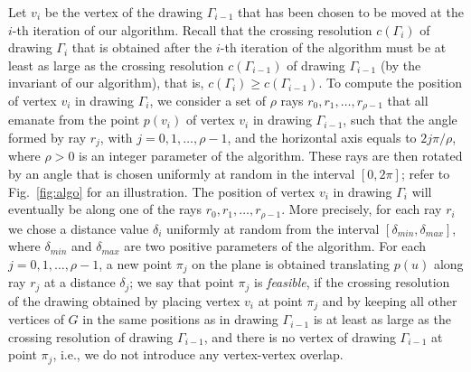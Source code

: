 \documentclass[runningheads]{llncs}
\begin{document}
Let $v_i$ be the vertex of the drawing $\Gamma_{i-1}$ that has been chosen to be moved at the $i$-th iteration of our algorithm. Recall that the crossing resolution $c(\Gamma_{i})$ of drawing $\Gamma_{i}$ that is obtained after the $i$-th iteration of the algorithm must be at least as large as the crossing resolution $c(\Gamma_{i-1})$ of drawing $\Gamma_{i-1}$ (by the invariant of our algorithm), that is, $c(\Gamma_i) \ge c(\Gamma_{i-1})$. To compute the position of vertex $v_i$ in drawing $\Gamma_i$, we consider a set of $\rho$ rays $r_0,r_1,\ldots,r_{\rho-1}$ that all emanate from the point $p(v_i)$ of vertex $v_i$ in drawing $\Gamma_{i-1}$, such that the angle formed by ray $r_j$, with $j=0,1,\ldots,\rho-1$, and the horizontal axis equals to $2j\pi/\rho$, where $\rho>0$ is an integer parameter of the algorithm. These rays are then rotated by an angle that is chosen uniformly at random in the interval $[0,2\pi]$; refer to Fig.~\ref{fig:algo} for an illustration. The position of vertex $v_i$ in drawing $\Gamma_i$ will eventually be along one of the rays $r_0,r_1,\ldots,r_{\rho-1}$. More precisely, for each ray $r_i$ we chose a distance value $\delta_i$ uniformly at random from the interval $[\delta_{min},\delta_{max}]$, where $\delta_{min}$ and $\delta_{max}$ are two positive parameters of the algorithm. For each $j=0,1,\ldots,\rho-1$, a new point $\pi_j$ on the plane is obtained translating $p(u)$ along ray $r_j$ at a distance $\delta_j$; we say that point $\pi_j$ is \emph{feasible}, if the crossing resolution of the drawing obtained by placing vertex $v_i$ at point $\pi_j$ and by keeping all other vertices of $G$ in the same positions as in drawing $\Gamma_{i-1}$ is at least as large as the crossing resolution of drawing $\Gamma_{i-1}$, and there is no vertex of drawing $\Gamma_{i-1}$ at point $\pi_j$, i.e., we do not introduce any vertex-vertex overlap. 
\end{document}

